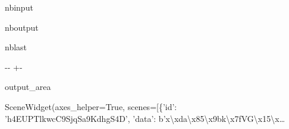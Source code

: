 \documentclass[letterpaper,10pt,english]{sphinxmanual}
\begin{document}
\begin{sphinxuseclass}{nbinput}
{
\begin{sphinxVerbatim}[commandchars=\\\{\}]
\llap{\color{nbsphinxin}[10]:\,\hspace{\fboxrule}\hspace{\fboxsep}}
              
             
              
\end{sphinxVerbatim}
}

\end{sphinxuseclass}
\begin{sphinxuseclass}{nboutput}
\begin{sphinxuseclass}{nblast}
{

\kern-\sphinxverbatimsmallskipamount\kern-\baselineskip
\kern+\FrameHeightAdjust\kern-\fboxrule
\vspace{\nbsphinxcodecellspacing}

\begin{sphinxuseclass}{output_area}
\begin{sphinxuseclass}{}


\begin{sphinxVerbatim}[commandchars=\\\{\}]
\llap{\color{nbsphinxout}[10]:\,\hspace{\fboxrule}\hspace{\fboxsep}}SceneWidget(axes\_helper=True, scenes=[\{'id': 'h4EUPTlkwcC9SjqSa9KdhgS4D', 'data': b'x\textbackslash{}xda\textbackslash{}x85\textbackslash{}x9bk\textbackslash{}x7fVG\textbackslash{}x15\textbackslash{}x…
\end{sphinxVerbatim}



\end{sphinxuseclass}
\end{sphinxuseclass}
}

\end{sphinxuseclass}
\end{sphinxuseclass}
\end{document}
